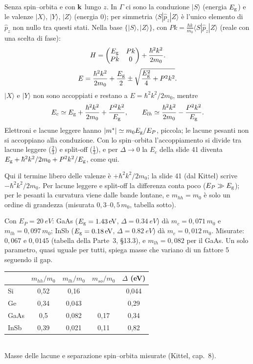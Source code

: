 \documentclass[11pt,a4paper]{article}
\begin{document}
\begin{approfondimento}
Senza spin--orbita e con $\mathbf k$ lungo $z$. In $\Gamma$ ci sono la conduzione $|S\rangle$ (energia $E_{\mathrm g}$) e le valenze $|X\rangle$, $|Y\rangle$, $|Z\rangle$
(energia $0$); per simmetria $\langle S|\hat p_z|Z\rangle$ è l'unico elemento di $\hat p_z$ non nullo tra questi stati.
Nella base $\{|S\rangle,|Z\rangle\}$, con $Pk=\frac{\hbar k}{m_0}\langle S|\hat p_z|Z\rangle$ (reale con una scelta di fase):
\[
H=\begin{pmatrix}E_{\mathrm g}&Pk\\Pk&0\end{pmatrix}+\frac{\hbar^2k^2}{2m_0}.
\]
\[
E=\frac{\hbar^2k^2}{2m_0}+\frac{E_{\mathrm g}}2\pm\sqrt{\frac{E_{\mathrm g}^2}4+P^2k^2}.
\]
$|X\rangle$ e $|Y\rangle$ non sono accoppiati e restano a $E=\hbar^2k^2/2m_0$, mentre
\[
E_c\simeq E_{\mathrm g}+\frac{\hbar^2k^2}{2m_0}+\frac{P^2k^2}{E_{\mathrm g}},\qquad E_{lh}\simeq\frac{\hbar^2k^2}{2m_0}-\frac{P^2k^2}{E_{\mathrm g}} .
\]
Elettroni e lacune leggere hanno $|m^*|\simeq m_0E_{\mathrm g}/E_P$, piccola; le lacune pesanti non si accoppiano alla conduzione. Con lo spin--orbita
l'accoppiamento si divide tra lacune leggere ($\frac23$) e split-off ($\frac13$), e per $\Delta\to0$ la $E_c$ della slide 41 diventa
$E_{\mathrm g}+\hbar^2k^2/2m_0+P^2k^2/E_{\mathrm g}$, come qui.
\end{approfondimento}
Qui il termine libero delle valenze è $+\hbar^2k^2/2m_0$; la slide 41 (dal Kittel) scrive $-\hbar^2k^2/2m_0$. Per lacune leggere e split-off la
differenza conta poco ($E_P\gg E_{\mathrm g}$); per le pesanti la curvatura viene dalle bande lontane, e $m_{hh}=m_0$ è solo un ordine di grandezza
(misurata $0{,}3$--$0{,}5\,m_0$, tabella sotto).

\begin{esempio}
Con $E_P=\SI{20}{eV}$: GaAs ($E_{\mathrm g}=\SI{1.43}{eV}$, $\Delta=\SI{0.34}{eV}$) dà $m_c=0{,}071\,m_0$ e $m_{lh}=0{,}097\,m_0$; InSb ($E_{\mathrm g}=\SI{0.18}{eV}$,
$\Delta=\SI{0.82}{eV}$) dà $m_c=0{,}012\,m_0$. Misurate: $0{,}067$ e $0{,}0145$ (tabella della Parte~3, §13.3), e $m_{lh}=0{,}082$ per il GaAs. Un
solo parametro, quasi uguale per tutti, spiega masse che variano di un fattore 5 seguendo il gap.
\end{esempio}

\begin{center}\small
\begin{tabular}{@{}lcccc@{}}
\toprule
& $m_{hh}/m_0$ & $m_{lh}/m_0$ & $m_{so}/m_0$ & $\Delta$ (eV)\\
\midrule
Si & 0,52 & 0,16 & & 0,044\\
Ge & 0,34 & 0,043 & & 0,29\\
GaAs & 0,5 & 0,082 & 0,17 & 0,34\\
InSb & 0,39 & 0,021 & 0,11 & 0,82\\
\bottomrule
\end{tabular}\\[3pt]
{\footnotesize Masse delle lacune e separazione spin--orbita misurate (Kittel, cap.~8).}
\end{center}
\end{document}
